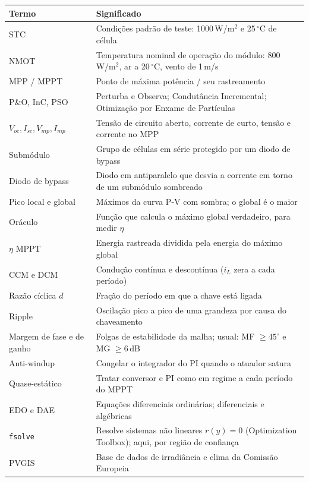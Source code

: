 {\small
\begin{longtable}{@{}p{3.6cm}p{12.4cm}@{}}
\toprule
Termo & Significado \\ \midrule \endhead
STC & Condi\c{c}\~oes padr\~ao de teste: 1000\,W/m$^2$ e 25\,$^\circ$C de c\'elula \\
NMOT & Temperatura nominal de opera\c{c}\~ao do m\'odulo: 800\,W/m$^2$, ar a 20\,$^\circ$C, vento de 1\,m/s \\
MPP / MPPT & Ponto de m\'axima pot\^encia / seu rastreamento \\
P\&O, InC, PSO & Perturba e Observa; Condut\^ancia Incremental; Otimiza\c{c}\~ao por Enxame de Part\'iculas \\
$V_{oc},I_{sc},V_{mp},I_{mp}$ & Tens\~ao de circuito aberto, corrente de curto, tens\~ao e corrente no MPP \\
Subm\'odulo & Grupo de c\'elulas em s\'erie protegido por um diodo de bypass \\
Diodo de bypass & Diodo em antiparalelo que desvia a corrente em torno de um subm\'odulo sombreado \\
Pico local e global & M\'aximos da curva P-V com sombra; o global \'e o maior \\
Or\'aculo & Fun\c{c}\~ao que calcula o m\'aximo global verdadeiro, para medir $\eta$ \\
$\eta$ MPPT & Energia rastreada dividida pela energia do m\'aximo global \\
CCM e DCM & Condu\c{c}\~ao cont\'inua e descont\'inua ($i_L$ zera a cada per\'iodo) \\
Raz\~ao c\'iclica $d$ & Fra\c{c}\~ao do per\'iodo em que a chave est\'a ligada \\
Ripple & Oscila\c{c}\~ao pico a pico de uma grandeza por causa do chaveamento \\
Margem de fase e de ganho & Folgas de estabilidade da malha; usual: MF $\ge45^\circ$ e MG $\ge6$\,dB \\
Anti-windup & Congelar o integrador do PI quando o atuador satura \\
Quase-est\'atico & Tratar conversor e PI como em regime a cada per\'iodo do MPPT \\
EDO e DAE & Equa\c{c}\~oes diferenciais ordin\'arias; diferenciais e alg\'ebricas \\
\texttt{fsolve} & Resolve sistemas n\~ao lineares $r(y)=0$ (Optimization Toolbox); aqui, por regi\~ao de confian\c{c}a \\
PVGIS & Base de dados de irradi\^ancia e clima da Comiss\~ao Europeia \\
\bottomrule
\end{longtable}}

